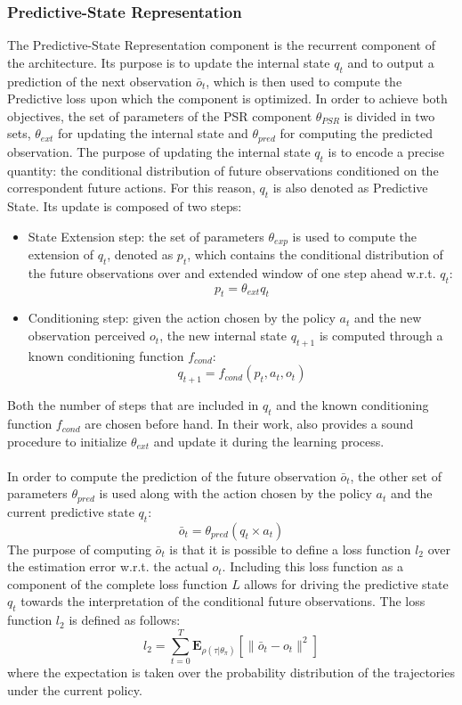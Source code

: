             \subsubsection{Predictive-State Representation}
                The Predictive-State Representation component is the recurrent component of the architecture. Its purpose is to update the internal state $q_t$ and to output a prediction of the next observation $\bar{o}_t$, which is then used to compute the Predictive loss upon which the component is optimized. In order to achieve both objectives, the set of parameters of the PSR component $\theta_{PSR}$ is divided in two sets, $\theta_{ext}$ for updating the internal state and $\theta_{pred}$ for computing the predicted observation. \newline
                The purpose of updating the internal state $q_t$ is to encode a precise quantity: the conditional distribution of future observations conditioned on the correspondent future actions. For this reason, $q_t$ is also denoted as Predictive State. Its update is composed of two steps:
                \begin{itemize}
                    \item State Extension step: the set of parameters $\theta_{exp}$ is used to compute the extension of $q_t$, denoted as $p_t$, which contains the conditional distribution of the future observations over and extended window of one step ahead w.r.t. $q_t$:
                    \[ p_t = \theta_{ext} q_t\]
                    \item Conditioning step: given the action chosen by the policy $a_t$ and the new observation perceived $o_t$, the new internal state $q_{t+1}$ is computed through a known conditioning function $f_{cond}$:
                    \[ q_{t+1} = f_{cond}(p_t, a_t, o_t)\]
                \end{itemize}
                
                Both the number of steps that are included in $q_t$ and the known conditioning function $f_{cond}$ are chosen before hand. In their work,  also provides a sound procedure to initialize $\theta_{ext}$ and update it during the learning process.
                \\\\
                In order to compute the prediction of the future observation $\bar{o}_t$, the other set of parameters $\theta_{pred}$ is used along with the action chosen by the policy $a_t$ and the current predictive state $q_t$:
                \[ \bar{o}_t = \theta_{pred} (q_t \times a_t)\]
                The purpose of computing $\bar{o}_t$ is that it is possible to define a loss function $l_2$ over the estimation error w.r.t. the actual $o_t$. Including this loss function as a component of the complete loss function $L$ allows for driving the predictive state $q_t$ towards the interpretation of the conditional future observations. The loss function $l_2$ is defined as follows:
                \[ l_2 = \sum_{t=0}^{T} \mathbf{E}_{\rho(\tau|\theta_\pi)} \left[ \| \bar{o}_t - o_t \|^2 \right]\]
                where the expectation is taken over the probability distribution of the trajectories under the current policy.
            
